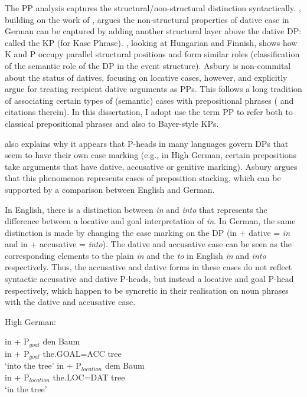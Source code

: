 The PP analysis captures the structural/non-structural distinction syntactically. \cite{Bayer.2001}, building on the work of \cite{Bittner.1996}, argues the non-structural properties of dative case in German can be captured by adding another structural layer above the dative DP: called the KP (for Kase Phrase). \cite{Asbury.2005,Asbury.2007}, looking at Hungarian and Finnish, shows how K and P occupy parallel structural positions and form similar roles (classification of the semantic role of the DP in the event structure). Asbury is non-commital about the status of datives, focusing on locative cases, however, \cite{Rezac.2008} and \cite{Caha.2009} explicitly argue for treating recipient dative arguments as PPs. This follows a long tradition of associating certain types of (semantic) cases with prepositional phrases (\citealt{McFadden.2004} and citations therein). In this dissertation, I adopt use the term PP to refer both to classical prepositional phrases and also to Bayer-style KPs.

\cite{Asbury.2005} also explains why it appears that P-heads in many languages govern DPs that seem to have their own case marking (e.g., in High German, certain prepositions take arguments that have dative, accusative or genitive marking). Asbury argues that this phenomenon represents cases of preposition stacking, which can be supported by a comparison between English and German. 

In English, there is a distinction between \textit{in} and \textit{into} that represents the difference between a locative and goal interpretation of \textit{in}. In German, the same distinction is made by changing the case marking on the DP (in + dative = \textit{in} and in + accusative = \textit{into}). The dative and accusative case can be seen as the corresponding elements to the plain \textit{in} and the \textit{to} in English \textit{in} and \textit{into} respectively. Thus, the accusative and dative forms in these cases do not reflect syntactic accusative and dative P-heads, but instead a locative and goal P-head respectively, which happen to be syncretic in their realisation on noun phrases with the dative and accusative case.

\begin{exe}
	\ex High German:\label{ex:hg-Pcomp}
	\begin{xlist}
		\ex \gll in + P$_{goal}$ den Baum\\
			 in + P$_{goal}$ the.GOAL=ACC tree\\
			 \trans `into the tree'
		\ex \gll in + P$_{location}$ dem Baum\\
			 in + P$_{location}$ the.LOC=DAT tree\\
			 \trans `in the tree'
	\end{xlist}

\end{exe}

